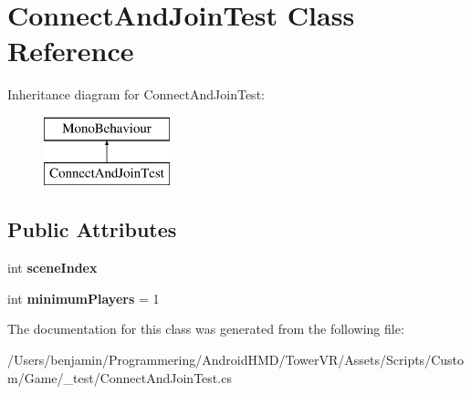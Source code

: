 \hypertarget{class_connect_and_join_test}{}\section{Connect\+And\+Join\+Test Class Reference}
\label{class_connect_and_join_test}
Inheritance diagram for Connect\+And\+Join\+Test\+:\begin{figure}[H]
\begin{center}
\leavevmode
\includegraphics[height=2.000000cm]{class_connect_and_join_test}
\end{center}
\end{figure}
\subsection*{Public Attributes}
\begin{DoxyCompactItemize}
\item 
int {\bfseries scene\+Index}\hypertarget{class_connect_and_join_test_a0861f0b04875328996bddd5b8f7c8ba8}{}\label{class_connect_and_join_test_a0861f0b04875328996bddd5b8f7c8ba8}

\item 
int {\bfseries minimum\+Players} = 1\hypertarget{class_connect_and_join_test_a26634289011e3601ab561cadd1bdd569}{}\label{class_connect_and_join_test_a26634289011e3601ab561cadd1bdd569}

\end{DoxyCompactItemize}


The documentation for this class was generated from the following file\+:\begin{DoxyCompactItemize}
\item 
/\+Users/benjamin/\+Programmering/\+Android\+H\+M\+D/\+Tower\+V\+R/\+Assets/\+Scripts/\+Custom/\+Game/\+\_\+test/Connect\+And\+Join\+Test.\+cs\end{DoxyCompactItemize}
